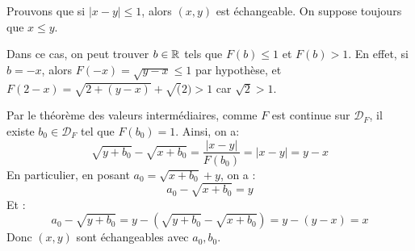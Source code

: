 \documentclass[]{../templates/homework}
\begin{document}
\subproblem
Prouvons que si $|x-y| \leq 1$, alors $(x,y)$ est échangeable. On suppose toujours que $x \leq y$.

Dans ce cas, on peut trouver $b\in\mathbb R$ tels que $F(b) \leq 1$ et $F(b) > 1$. En effet, si $b=-x$, alors $F(-x) = \sqrt{y-x} \leq 1$ par hypothèse, et $F(2-x) = \sqrt{2+(y-x)} + \sqrt(2) > 1$ car $\sqrt{2} > 1$.

Par le théorème des valeurs intermédiaires, comme $F$ est continue sur $\mathcal D_F$, il existe $b_0 \in \mathcal D_F$ tel que $F(b_0) = 1$. Ainsi, on a:
\begin{equation*}
	\sqrt{y+b_0} - \sqrt{x+b_0} = \frac{|x-y|}{F(b_0)} = |x-y| = y-x
\end{equation*}
En particulier, en posant $a_0 = \sqrt{x+b_0} + y$, on a : $$a_0 - \sqrt{x+b_0} = y$$
Et :$$a_0 - \sqrt{y+b_0} = y - (\sqrt{y+b_0} - \sqrt{x+b_0}) = y - (y-x) = x$$
Donc $(x,y)$ sont échangeables avec $a_0, b_0$.
\end{document}
